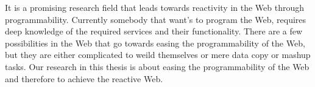 


It is a promising research field that leads towards reactivity in the Web through programmability.
Currently somebody that want's to program the Web, requires deep knowledge of the required services and their functionality.
There are a few possibilities in the Web that go towards easing the programmability of the Web, but they are either complicated to weild themselves or mere data copy or mashup tasks.
Our research in this thesis is about easing the programmability of the Web and therefore to achieve the reactive Web. 
